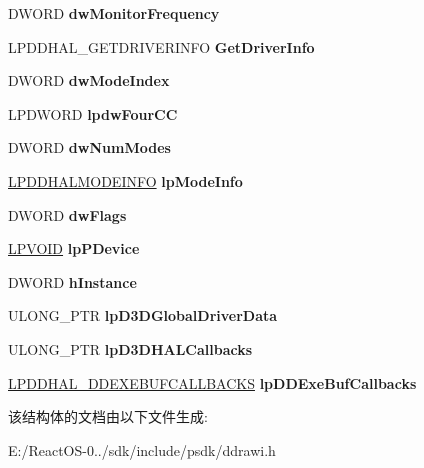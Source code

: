 \begin{DoxyCompactItemize}
D\+W\+O\+RD {\bfseries dw\+Monitor\+Frequency}
\item 
\mbox{\label{struct___d_d_h_a_l_i_n_f_o_a1dfc1754687779ce3840782e03276d92}} 
L\+P\+D\+D\+H\+A\+L\+\_\+\+G\+E\+T\+D\+R\+I\+V\+E\+R\+I\+N\+FO {\bfseries Get\+Driver\+Info}
\item 
\mbox{\label{struct___d_d_h_a_l_i_n_f_o_a169f9c8c572b5605f157b0800a514eb4}} 
D\+W\+O\+RD {\bfseries dw\+Mode\+Index}
\item 
\mbox{\label{struct___d_d_h_a_l_i_n_f_o_a28c66f16339459b64e5c446f526022e5}} 
L\+P\+D\+W\+O\+RD {\bfseries lpdw\+Four\+CC}
\item 
\mbox{\label{struct___d_d_h_a_l_i_n_f_o_afa99abb641ed2914174faa7bb49f6165}} 
D\+W\+O\+RD {\bfseries dw\+Num\+Modes}
\item 
\mbox{\label{struct___d_d_h_a_l_i_n_f_o_a87bf61d1135eddb66449d60f33e5fc37}} 
\hyperlink{struct___d_d_h_a_l_m_o_d_e_i_n_f_o}{L\+P\+D\+D\+H\+A\+L\+M\+O\+D\+E\+I\+N\+FO} {\bfseries lp\+Mode\+Info}
\item 
\mbox{\label{struct___d_d_h_a_l_i_n_f_o_a0f2e9cae36373423755b14cb44d4c6ed}} 
D\+W\+O\+RD {\bfseries dw\+Flags}
\item 
\mbox{\label{struct___d_d_h_a_l_i_n_f_o_a48476e33bff9916f12dc0a8c3c70835a}} 
\hyperlink{interfacevoid}{L\+P\+V\+O\+ID} {\bfseries lp\+P\+Device}
\item 
\mbox{\label{struct___d_d_h_a_l_i_n_f_o_acae582d325ee04d3dd351c4d0c2b6083}} 
D\+W\+O\+RD {\bfseries h\+Instance}
\item 
\mbox{\label{struct___d_d_h_a_l_i_n_f_o_a477969ed968a90ace335f1c94aa59340}} 
U\+L\+O\+N\+G\+\_\+\+P\+TR {\bfseries lp\+D3\+D\+Global\+Driver\+Data}
\item 
\mbox{\label{struct___d_d_h_a_l_i_n_f_o_af4f75a7815afd27274ee4027d806664b}} 
U\+L\+O\+N\+G\+\_\+\+P\+TR {\bfseries lp\+D3\+D\+H\+A\+L\+Callbacks}
\item 
\mbox{\label{struct___d_d_h_a_l_i_n_f_o_a20966d213deeb0ad945ae57238fec381}} 
\hyperlink{struct___d_d_h_a_l___d_d_e_x_e_b_u_f_c_a_l_l_b_a_c_k_s}{L\+P\+D\+D\+H\+A\+L\+\_\+\+D\+D\+E\+X\+E\+B\+U\+F\+C\+A\+L\+L\+B\+A\+C\+KS} {\bfseries lp\+D\+D\+Exe\+Buf\+Callbacks}
\end{DoxyCompactItemize}


该结构体的文档由以下文件生成\+:\begin{DoxyCompactItemize}
\item 
E\+:/\+React\+O\+S-\/0../sdk/include/psdk/ddrawi.\+h\end{DoxyCompactItemize}
